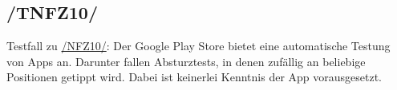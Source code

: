 \subsection*{/TNFZ10/}

\label{/TNFZ10/} Testfall zu \hyperref[/NFZ10/]{/NFZ10/}: Der \Gls{Google Play Store} bietet eine automatische Testung von Apps an.
Darunter fallen Absturztests, in denen zufällig an beliebige Positionen getippt wird.
Dabei ist keinerlei Kenntnis der App vorausgesetzt.
